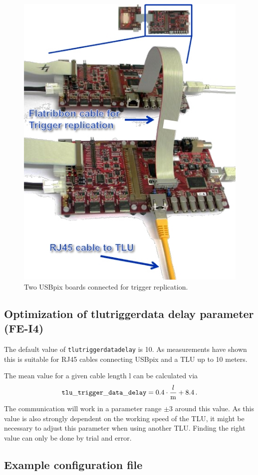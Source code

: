 \documentclass[a4paper,12pt]{article}
\begin{document}
\begin{figure}[t]
\centerline{\includegraphics[width=.6\textwidth]{trigger_repl.jpg}}
 \caption{Two USBpix boards connected for trigger replication.\label{fig:trgrep}}
\end{figure}

\subsection{Optimization of tlu\textunderscore trigger\textunderscore data\textunderscore 
delay parameter (FE-I4)}

The default value of {\tt tlu\textunderscore trigger\textunderscore data\textunderscore delay}
is 10. As measurements have shown this
is suitable for RJ45 cables connecting USBpix and a TLU up to 10 meters.

The mean value for a given cable length l can be calculated via 
\[ {\tt tlu\_ trigger\_ data\_ delay}= 0.4\cdot \frac{l}{\rm m}+8.4\, .\]
The communication will work in a parameter range $\pm 3$ 
around this value.
As this value is also strongly dependent on the working speed of the TLU, it might
be necessary to adjust this parameter when using another TLU. Finding the right value
can only be done by trial and error.

\subsection{Example configuration file}\label{sec:exacfg}
\end{document}
